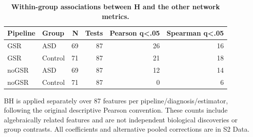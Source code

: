 \begin{table}[H]
\centering\small
\caption{\textbf{Within-group associations between H and the other network metrics.}}\label{tab:Hcounts}
\begin{tabular}{llrrrr}
\toprule
Pipeline & Group & N & Tests & Pearson q<.05 & Spearman q<.05 \\
\midrule
GSR & ASD & 69 & 87 & 26 & 16 \\
GSR & Control & 71 & 87 & 21 & 18 \\
noGSR & ASD & 69 & 87 & 12 & 14 \\
noGSR & Control & 71 & 87 & 0 & 6 \\
\bottomrule
\end{tabular}
\begin{flushleft}\footnotesize
BH is applied separately over 87 features per pipeline/diagnosis/estimator, following the original descriptive Pearson convention. These counts include algebraically related features and are not independent biological discoveries or group contrasts. All coefficients and alternative pooled corrections are in S2 Data.
\end{flushleft}
\end{table}
